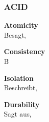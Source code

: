 
\subsubsection{ACID}
\label{ACID}
    \begin{description}
        \item \textbf{Atomicity}\hfill \\Besagt,
        \item \textbf{Consistency}\hfill \\B
        \item \textbf{Isolation}\hfill \\Beschreibt,
        \item \textbf{Durability}\hfill \\Sagt aus,
    \end{description}
